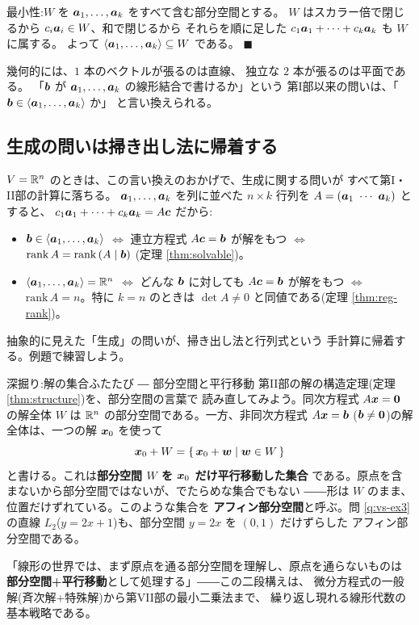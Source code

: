 最小性:$W$ を $\bm{a}_1, \dots, \bm{a}_k$ をすべて含む部分空間とする。
$W$ はスカラー倍で閉じるから $c_i\bm{a}_i \in W$、和で閉じるから
それらを順に足した $c_1\bm{a}_1 + \cdots + c_k\bm{a}_k$ も $W$ に属する。
よって $\langle \bm{a}_1, \dots, \bm{a}_k \rangle \subseteq W$ である。
$\blacksquare$

幾何的には、$1$ 本のベクトルが張るのは直線、
独立な $2$ 本が張るのは平面である。
「$\bm{b}$ が $\bm{a}_1, \dots, \bm{a}_k$ の線形結合で書けるか」という
第I部以来の問いは、「$\bm{b} \in \langle \bm{a}_1, \dots, \bm{a}_k \rangle$ か」
と言い換えられる。

\subsection*{生成の問いは掃き出し法に帰着する}

$V = \mathbb{R}^n$ のときは、この言い換えのおかげで、生成に関する問いが
すべて第I・II部の計算に落ちる。
$\bm{a}_1, \dots, \bm{a}_k$ を列に並べた $n \times k$ 行列を
$A = (\vect{a}_1 \ \cdots \ \vect{a}_k)$ とすると、
$c_1\bm{a}_1 + \cdots + c_k\bm{a}_k = A\bm{c}$ だから:
\begin{itemize}
\item $\bm{b} \in \langle \bm{a}_1, \dots, \bm{a}_k \rangle$
$\iff$ 連立方程式 $A\bm{c} = \bm{b}$ が解をもつ
$\iff$ $\mathrm{rank}\,A = \mathrm{rank}\,(A \mid \bm{b})$
(定理 \ref{thm:solvable})。
\item $\langle \bm{a}_1, \dots, \bm{a}_k \rangle = \mathbb{R}^n$
$\iff$ どんな $\bm{b}$ に対しても $A\bm{c} = \bm{b}$ が解をもつ
$\iff$ $\mathrm{rank}\,A = n$。特に $k = n$ のときは
$\det A \neq 0$ と同値である(定理 \ref{thm:reg-rank})。
\end{itemize}
抽象的に見えた「生成」の問いが、掃き出し法と行列式という
手計算に帰着する。例題で練習しよう。

\begin{itembox}[l]{深掘り:解の集合ふたたび ― 部分空間と平行移動}
第II部の解の構造定理(定理 \ref{thm:structure})を、部分空間の言葉で
読み直してみよう。同次方程式 $A\bm{x} = \bm{0}$ の解全体 $W$ は
$\mathbb{R}^n$ の部分空間である。一方、非同次方程式 $A\bm{x} = \bm{b}$
($\bm{b} \neq \bm{0}$)の解全体は、一つの解 $\bm{x}_0$ を使って
\[
\bm{x}_0 + W = \{\, \bm{x}_0 + \bm{w} \mid \bm{w} \in W \,\}
\]
と書ける。これは\textbf{部分空間 $W$ を $\bm{x}_0$ だけ平行移動した集合}
である。原点を含まないから部分空間ではないが、でたらめな集合でもない
――形は $W$ のまま、位置だけずれている。このような集合を
\textbf{アフィン部分空間}と呼ぶ。問 \ref{q:vs-ex3} の直線
$L_2$($y = 2x + 1$)も、部分空間 $y = 2x$ を $(0, 1)$ だけずらした
アフィン部分空間である。

「線形の世界では、まず原点を通る部分空間を理解し、原点を通らないものは
\textbf{部分空間+平行移動}として処理する」――この二段構えは、
微分方程式の一般解(斉次解+特殊解)から第VII部の最小二乗法まで、
繰り返し現れる線形代数の基本戦略である。
\end{itembox}

